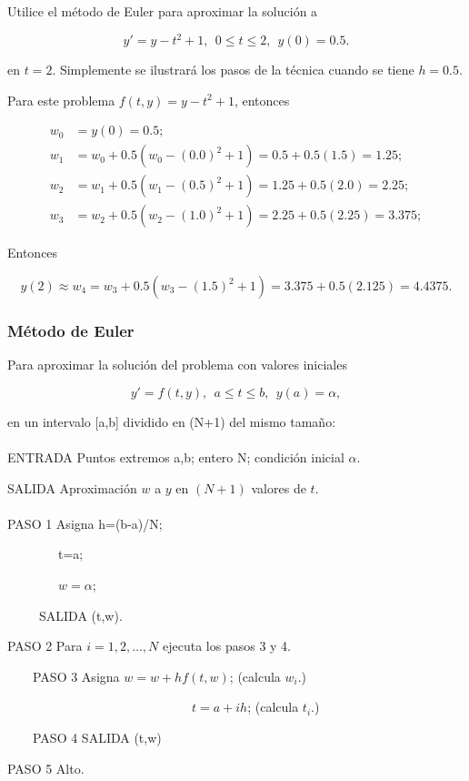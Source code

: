 Utilice el método de Euler para aproximar la solución a

\begin{equation*}
    y'=y-t^2+1, \ \ 0\leq t\leq 2, \ \ y(0)=0.5.
\end{equation*}

en $t=2$. Simplemente se ilustrará los pasos de la técnica cuando se tiene $h=0.5$. 

Para este problema $f(t,y)=y-t^2+1$, entonces

\begin{equation*}
\begin{split}
    w_0&=y(0)=0.5; \\
    w_1&=w_0+0.5(w_0-(0.0)^2+1)=0.5+0.5(1.5)=1.25; \\
    w_2&=w_1+0.5(w_1-(0.5)^2+1)=1.25+0.5(2.0)=2.25; \\
    w_3&=w_2+0.5(w_2-(1.0)^2+1)=2.25+0.5(2.25)=3.375;
\end{split}
\end{equation*}

Entonces

\begin{equation*}
    y(2)\approx w_4=w_3+0.5(w_3-(1.5)^2+1)=3.375+0.5(2.125)=4.4375.
\end{equation*}


\begin{tcolorbox}[colback=blue!15!]
\subsubsection*{Método de Euler}
Para aproximar la solución del problema con valores iniciales

\begin{equation*}
    y'=f(t,y), \ \  a\leq t\leq b, \ \ y(a)=\alpha,
\end{equation*}

en un intervalo [a,b] dividido en (N+1) del mismo tamaño:
\\ \\
ENTRADA Puntos extremos a,b; entero N; condición inicial $\alpha$.

SALIDA Aproximación $w$ a $y$ en $(N+1)$ valores de $t$.
\\ \\
PASO 1 Asigna h=(b-a)/N;

\ \ \ \ \ \ \ \ t=a;

\ \ \ \ \ \ \ \ $w=\alpha$;

\ \ \ \ \  SALIDA (t,w).

PASO 2 Para $i=1,2,\dotsc, N$ ejecuta los pasos 3 y 4.

\ \ \ \  PASO 3 Asigna $w=w+hf(t,w)$; (calcula $w_i$.)

\ \ \ \ \ \ \ \ \ \ \ \ \ \ \ \ \ \ \ \ \ \ \ \ \ \ \ \ \ $t=a+ih$; (calcula $t_i$.)

\ \ \ \  PASO 4  SALIDA (t,w)

PASO 5 Alto.

\end{tcolorbox}

